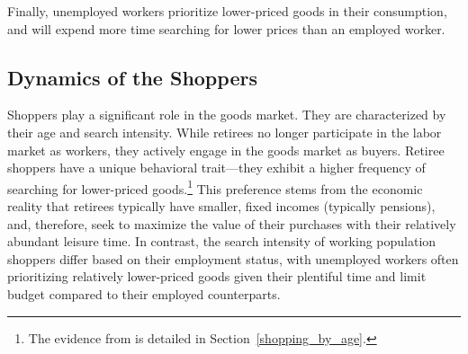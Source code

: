 \documentclass[ %
    final,
    scrbook,
    listoffigures,
    listoftables, 
    glossary]{cu-thesis}
\begin{document}
Finally, unemployed workers prioritize lower-priced goods in their consumption, and will expend more time searching for lower prices than an employed worker.

\subsection{Dynamics of the Shoppers}
Shoppers play a significant role in the goods market. They are characterized by their age and search intensity. While retirees no longer participate in the labor market as workers, they actively engage in the goods market as buyers. Retiree shoppers have a unique behavioral trait—they exhibit a higher frequency of searching for lower-priced goods.\footnote{The evidence from \cite{aguiar2007life} is detailed in Section~\ref{shopping_by_age}.} This preference stems from the economic reality that retirees typically have smaller, fixed incomes (typically pensions), and, therefore, seek to maximize the value of their purchases with their relatively abundant leisure time. In contrast, the search intensity of working population shoppers differ based on their employment status, with unemployed workers often prioritizing relatively lower-priced goods given their plentiful time and limit budget compared to their employed counterparts.
\end{document}
